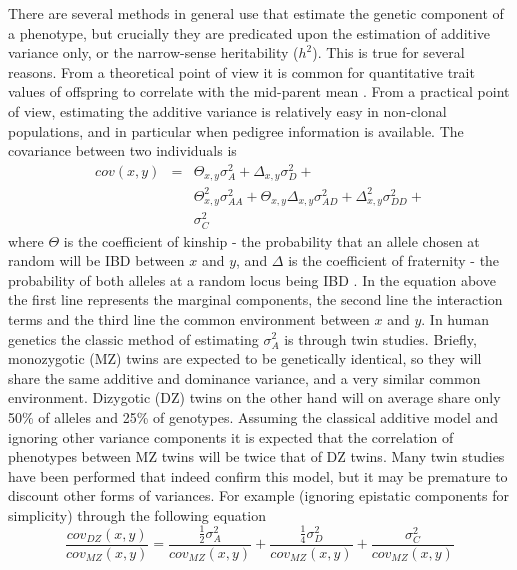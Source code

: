There are several methods in general use that estimate the genetic component of a phenotype, but crucially they are predicated upon the estimation of additive variance only, or the narrow-sense heritability ($h^2$). This is true for several reasons. From a theoretical point of view it is common for quantitative trait values of offspring to correlate with the mid-parent mean \citep{Fisher1918}. From a practical point of view, estimating the additive variance is relatively easy in non-clonal populations, and in particular when pedigree information is available. The covariance between two individuals is
\begin{eqnarray}
cov(x,y) &=& \Theta_{x,y}\sigma^{2}_{A} + \Delta_{x,y}\sigma^{2}_{D} + \nonumber \\
&& \Theta_{x,y}^{2}\sigma^{2}_{AA} +  \Theta_{x,y}\Delta_{x,y}\sigma^{2}_{AD} + \Delta_{x,y}^{2}\sigma^{2}_{DD} + \nonumber \\
&& \sigma^{2}_{C}
\end{eqnarray}
where $\Theta$ is the coefficient of kinship - the probability that an allele chosen at random will be IBD between $x$ and $y$, and $\Delta$ is the coefficient of fraternity - the probability of both alleles at a random locus being IBD \citep{Fisher1918, Jacquard1974}. In the equation above the first line represents the marginal components, the second line the interaction terms and the third line the common environment between $x$ and $y$. In human genetics the classic method of estimating $\sigma^{2}_{A}$ is through twin studies. Briefly, monozygotic (MZ) twins are expected to be genetically identical, so they will share the same additive and dominance variance, and a very similar common environment. Dizygotic (DZ) twins on the other hand will on average share only 50\% of alleles and 25\% of genotypes. Assuming the classical additive model and ignoring other variance components it is expected that the correlation of phenotypes between MZ twins will be twice that of DZ twins. Many twin studies have been performed that indeed confirm this model, but it may be premature to discount other forms of variances. For example (ignoring epistatic components for simplicity) through the following equation
\begin{equation}
\frac{cov_{DZ}(x,y)}{cov_{MZ}(x,y)} = \frac{\frac{1}{2} \sigma^{2}_{A}}{cov_{MZ}(x,y)} + \frac{\frac{1}{4} \sigma^{2}_{D}}{cov_{MZ}(x,y)} + \frac{\sigma^{2}_{C}}{cov_{MZ}(x,y)}
\end{equation}
